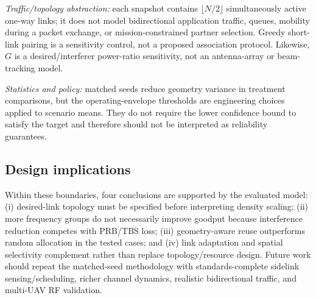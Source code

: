 \emph{Traffic/topology abstraction:} each snapshot contains $\lfloor N/2\rfloor$ simultaneously active one-way links; it does not model bidirectional application traffic, queues, mobility during a packet exchange, or mission-constrained partner selection. Greedy short-link pairing is a sensitivity control, not a proposed association protocol. Likewise, $G$ is a desired/interferer power-ratio sensitivity, not an antenna-array or beam-tracking model.

\emph{Statistics and policy:} matched seeds reduce geometry variance in treatment comparisons, but the operating-envelope thresholds are engineering choices applied to scenario means. They do not require the lower confidence bound to satisfy the target and therefore should not be interpreted as reliability guarantees.

\subsection{Design implications}
Within these boundaries, four conclusions are supported by the evaluated model: (i) desired-link topology must be specified before interpreting density scaling; (ii) more frequency groups do not necessarily improve goodput because interference reduction competes with PRB/TBS loss; (iii) geometry-aware reuse outperforms random allocation in the tested cases; and (iv) link adaptation and spatial selectivity complement rather than replace topology/resource design. Future work should repeat the matched-seed methodology with standards-complete sidelink sensing/scheduling, richer channel dynamics, realistic bidirectional traffic, and multi-UAV RF validation.
